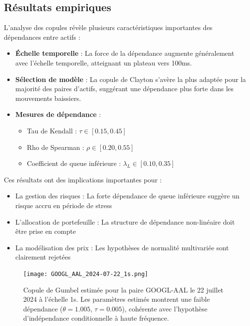 \documentclass[10pt,a4paper]{article}
\theoremstyle{definition}
\theoremstyle{remark}
\begin{document}
\begin{itemize}
\subsection{Résultats empiriques}

L'analyse des copules révèle plusieurs caractéristiques importantes des dépendances entre actifs :

    \begin{itemize}
    \item \textbf{Échelle temporelle} : La force de la dépendance augmente généralement avec l'échelle temporelle, atteignant un plateau vers 100ms.
    
    \item \textbf{Sélection de modèle} : La copule de Clayton s'avère la plus adaptée pour la majorité des paires d'actifs, suggérant une dépendance plus forte dans les mouvements baissiers.
    
    \item \textbf{Mesures de dépendance} :
    \begin{itemize}
        \item Tau de Kendall : $\tau \in [0.15, 0.45]$
        \item Rho de Spearman : $\rho \in [0.20, 0.55]$
        \item Coefficient de queue inférieure : $\lambda_L \in [0.10, 0.35]$
    \end{itemize}
    \end{itemize}
    
Ces résultats ont des implications importantes pour :
\begin{itemize}
    \item La gestion des risques : La forte dépendance de queue inférieure suggère un risque accru en période de stress
    \item L'allocation de portefeuille : La structure de dépendance non-linéaire doit être prise en compte
    \item La modélisation des prix : Les hypothèses de normalité multivariée sont clairement rejetées
\end{itemize}

\begin{figure}[h!]
\centering
    \texttt{[image: GOOGL\_AAL\_2024-07-22\_1s.png]}
    \caption{Copule de Gumbel estimée pour la paire GOOGL-AAL le 22 juillet 2024 à l'échelle 1s. Les paramètres estimés montrent une faible dépendance ($\theta = 1.005$, $\tau = 0.005$), cohérente avec l'hypothèse d'indépendance conditionnelle à haute fréquence.}
    \label{fig:copula_example}
\end{figure}





\end{itemize}
\end{document}
